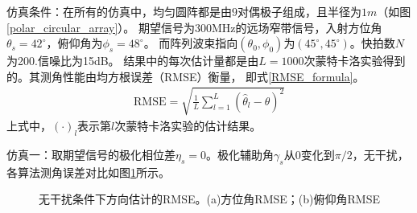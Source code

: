 \documentclass[master]{thesis-uestc}
\begin{document}
仿真条件：在所有的仿真中，均匀圆阵都是由$9$对偶极子组成，且半径为$1m$（如图\ref{polar_circular_array}）。
期望信号为300MHz的远场窄带信号，入射方位角$\theta_s=42^\circ$，俯仰角为$\phi_s=48^\circ$。
而阵列波束指向$(\theta_0,\phi_0)$为$(45^\circ,45^\circ)$。快拍数$N$为200.信噪比为15dB。
结果中的每次估计量都是由$L=1000$次蒙特卡洛实验得到的。其测角性能由均方根误差（RMSE）衡量，
即式\eqref{RMSE_formula}。
\begin{equation}\label{RMSE_formula}
    \begin{aligned}
        \text{RMSE} = \sqrt{\frac{1}{L}\sum_{l=1}^L\left(\hat{\theta}_l-\theta\right)^2}
    \end{aligned}
\end{equation}
上式中，$(\cdot)_l$表示第$l$次蒙特卡洛实验的估计结果。

仿真一：取期望信号的极化相位差$\eta_s=0$。极化辅助角$\gamma_s$从$0$变化到$\pi/2$，无干扰，
各算法测角误差对比如图\ref{Polar_RMSE_jammer_free}所示。
\begin{figure}[H]
    \caption{无干扰条件下方向估计的RMSE。(a)方位角RMSE；(b)俯仰角RMSE}
    \label{Polar_RMSE_jammer_free}
\end{figure}
\end{document}
